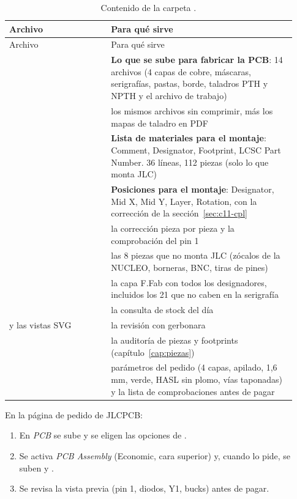 \begin{longtable}{@{}L{0.33\linewidth}L{0.60\linewidth}@{}}
\caption{Contenido de la carpeta .}\label{tab:c11-fab}\\
\toprule
Archivo & Para qué sirve\\\midrule\endfirsthead
\toprule
Archivo & Para qué sirve\\\midrule\endhead
{} & \textbf{Lo que se sube para fabricar la PCB}: 14 archivos (4 capas de cobre, máscaras, serigrafías, pastas, borde, taladros PTH y NPTH y el archivo de trabajo)\\
 & los mismos archivos sin comprimir, más los mapas de taladro en PDF\\
 & \textbf{Lista de materiales para el montaje}: Comment, Designator, Footprint, LCSC Part Number. 36 líneas, 112 piezas (solo lo que monta JLC)\\
 & \textbf{Posiciones para el montaje}: Designator, Mid X, Mid Y, Layer, Rotation, con la corrección de la sección~\ref{sec:c11-cpl}\\
 & la corrección pieza por pieza y la comprobación del pin 1\\
 & las 8 piezas que no monta JLC (zócalos de la NUCLEO, borneras, BNC, tiras de pines)\\
 & la capa F.Fab con todos los designadores, incluidos los 21 que no caben en la serigrafía\\
 & la consulta de stock del día\\
 y las vistas SVG & la revisión con gerbonara\\
 & la auditoría de piezas y footprints (capítulo~\ref{cap:piezas})\\
 & parámetros del pedido (4 capas, apilado, 1,6 mm, verde, HASL sin plomo, vías taponadas) y la lista de comprobaciones antes de pagar\\
\bottomrule
\end{longtable}

\begin{idea}
En la página de pedido de JLCPCB:
\begin{enumerate}
  \item En \emph{PCB} se sube  y se eligen las opciones de .
  \item Se activa \emph{PCB Assembly} (Economic, cara superior) y, cuando lo pide, se suben  y
  .
  \item Se revisa la vista previa (pin 1, diodos, Y1, bucks) antes de pagar.
\end{enumerate}
\end{idea}

